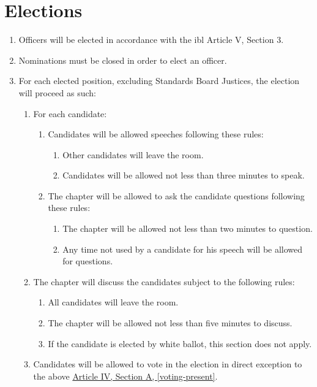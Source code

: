 \section{Elections}
	\label{elections}
	\begin{enumerate}
		\item Officers will be elected in accordance with the \gls{ibl} Article V, Section 3.
		\item Nominations must be closed in order to elect an officer.
		\item For each elected position, excluding Standards Board Justices, the election will proceed as such:
			\begin{enumerate}
				\item For each candidate:
					\begin{enumerate}
						\item Candidates will be allowed speeches following
						these rules:
							\begin{enumerate}
								\item Other candidates will leave the room.
								\item Candidates will be allowed not less than
								three minutes to speak.
							\end{enumerate}
						\item The chapter will be allowed to ask the
						candidate questions following these rules:
							\begin{enumerate}
								\item The chapter will be allowed not less
								than two minutes to question.
								\item Any time not used by a candidate for his
								speech will be allowed for questions.
							\end{enumerate}
					\end{enumerate}
				\item The chapter will discuss the candidates subject to the
				following rules:
					\begin{enumerate}
						\item All candidates will leave the room.
						\item The chapter will be allowed not less than five
						minutes to discuss.
						\item If the candidate is elected by white ballot, this section does not apply.
					\end{enumerate}
				\item Candidates will be allowed to vote in the election in direct exception to the above \hyperref[voting-present]{Article IV, Section A, \autoref*{voting-present}}.

\end{enumerate}
\end{enumerate}
